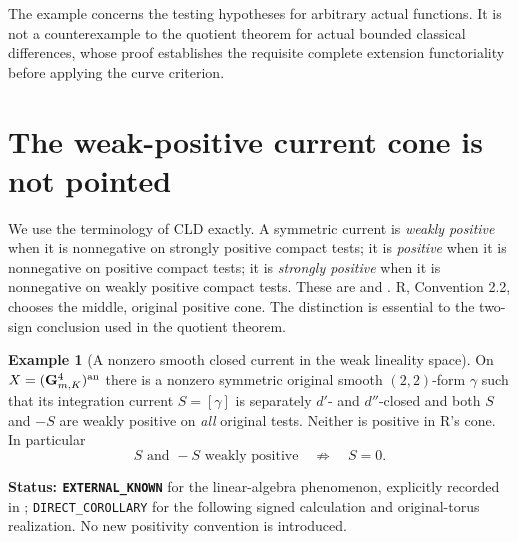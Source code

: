 \documentclass[11pt,a4paper]{article}
\numberwithin{equation}{section}
\theoremstyle{definition}
\newtheorem{example}[theorem]{Example}
\theoremstyle{remark}
\begin{document}
The example concerns the testing hypotheses
for arbitrary actual functions.  It is not a counterexample
to the quotient theorem for actual bounded classical
differences, whose proof establishes the requisite complete
extension functoriality before applying the curve criterion.



\section{The weak-positive current cone is not pointed}
\label{sec:r5-weak-cone-lineality}

We use the terminology of CLD exactly.  A symmetric current is
\emph{weakly positive} when it is nonnegative on strongly positive
compact tests; it is \emph{positive} when it is nonnegative on
positive compact tests; it is \emph{strongly positive} when it is
nonnegative on weakly positive compact tests.  These are
\cite[Definition 5.4.1]{CLD12} and
\cite[Definition 7.2.1]{CLD25}.  R, Convention 2.2, chooses the
middle, original positive cone.  The distinction is essential to
the two-sign conclusion used in the quotient theorem.

\begin{example}[A nonzero smooth closed current in the weak lineality space]
\label{ex:r5-weak-cone-lineality}
On $X=(\mathbf G_{m,K}^4)^{\rm an}$ there is a nonzero symmetric
original smooth $(2,2)$-form $\gamma$ such that its integration
current $S=[\gamma]$ is separately $d'$- and $d''$-closed and
both $S$ and $-S$ are weakly positive on \emph{all} original
tests.  Neither is positive in R's cone.  In particular
\[
       S\text{ and }-S\text{ weakly positive}
                          \quad\not\Longrightarrow\quad S=0.
\]
\end{example}

\noindent\textbf{Status: \texttt{EXTERNAL\_KNOWN}} for the
linear-algebra phenomenon, explicitly recorded in
\cite[Proposition 1.2.13 and the following paragraph]{CLD25};
\texttt{DIRECT\_COROLLARY} for the following signed calculation
and original-torus realization.  No new positivity convention is
introduced.
\end{document}
